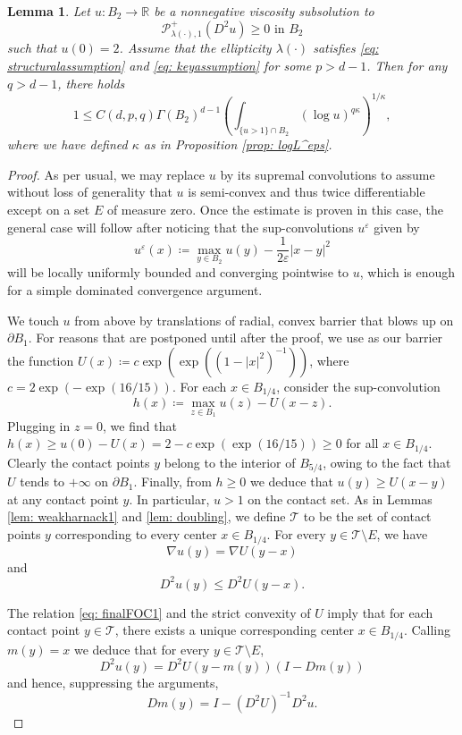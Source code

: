 \documentclass[reqno]{amsart}
\numberwithin{equation}{section}
\newtheorem{lem}[thm]{Lemma}
\numberwithin{equation}{section}
\newcommand{\R}{\mathbb R}
\newcommand{\eps}{\varepsilon}
\newcounter{case}
\begin{document}
\begin{lem}
\label{lem: LMP1}
Let $u:B_2 \to \R$ be a nonnegative viscosity subsolution to 
$$\mathcal{P}^+_{\lambda(\cdot),1}(D^2u)  \ge 0  \text{ in } B_2$$
such that $u(0)=2$. Assume that the ellipticity $\lambda(\cdot)$ satisfies \eqref{eq: structuralassumption} and \eqref{eq: keyassumption} for some $p>d-1$. Then for any $q>d-1$, there holds
$$1 \le C(d,p,q) \Gamma(B_2)^{d-1} \left(\int_{ \{u>1\}\cap B_2} (\log u)^{q\kappa}\right)^{1/\kappa},$$
where we have defined $\kappa$ as in Proposition \ref{prop: logL^eps}.
\end{lem}
\begin{proof}
As per usual, we may replace $u$ by its supremal convolutions to assume without loss of generality that $u$ is semi-convex and thus twice differentiable except on a set $E$ of measure zero. Once the estimate is proven in this case, the general case will follow after noticing that the sup-convolutions $u^\eps$ given by 
$$u^\eps(x)\coloneqq \max_{y \in B_2} u(y) -\frac{1}{2\eps}|x-y|^2$$
will be locally uniformly bounded and converging pointwise to $u$, which is enough for a simple dominated convergence argument. 

We touch $u$ from above by translations of radial, convex barrier that blows up on $\partial B_1$. For reasons that are postponed until after the proof, we use as our barrier the function $U(x) \coloneqq c\exp(\exp((1-|x|^2)^{-1}))$, where $c = 2\exp(-\exp(16/15))$. For each $x \in B_{1/4}$, consider the sup-convolution
$$h(x) \coloneqq  \max_{z\in B_1} u(z) - U(x-z).$$
Plugging in $z =0$, we find that $h(x) \ge u(0) - U(x) =2 - c\exp(\exp(16/15)) \ge 0$
for all $x \in B_{1/4}$. Clearly the contact points $y$ belong to the interior of $B_{5/4}$, owing to the fact that $U$ tends to $+\infty$ on $\partial B_1$. Finally, from $h\ge 0$ we deduce that $u(y) \ge U(x-y)$ at any contact point $y$. In particular, $u  >1$ on the contact set. 
As in Lemmas \ref{lem: weakharnack1} and \ref{lem: doubling}, we define $\mathcal{T}$ to be the set of contact points $y$ corresponding to every center $x \in B_{1/4}$. For every $y \in \mathcal{T}\setminus E$, we have
\begin{equation}
    \label{eq: finalFOC1}
\nabla u(y) = \nabla U(y-x)
\end{equation}
and
\begin{equation}
    \label{eq: finalFOC2}
    D^2u(y) \le D^2U(y-x).
\end{equation}

The relation \eqref{eq: finalFOC1} and the strict convexity of $U$ imply that for each contact point $y \in \mathcal{T}$, there exists a unique corresponding center $x \in B_{1/4}$. Calling $m(y)=x$ we deduce that for every $y \in \mathcal{T}\setminus E$,
$$D^2u(y) = D^2U(y-m(y))(I-Dm(y))$$
and hence, suppressing the arguments,
$$Dm(y) = I-(D^2U)^{-1}D^2u.$$


\end{proof}
\end{document}
